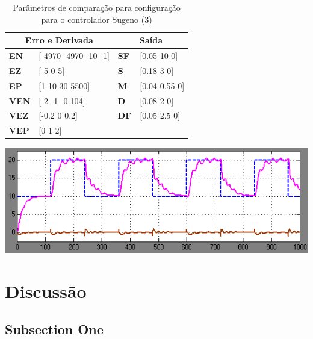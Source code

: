 \documentclass[
	twoside,				%
	twocolumn,				%
	english,				%
	brazil,					%
]{article}
\begin{document}
\begin{table}
\caption{Parâmetros de comparação para configuração para o controlador Sugeno (3)}
\centering
\begin{tabular}{llll}
\toprule
\multicolumn{2}{c}{\textbf{Erro e Derivada}} & \multicolumn{2}{c}{\textbf{Saída}}  \\
\midrule
\textbf{EN} & [-4970 -4970 -10 -1] & \textbf{SF} & [0.05 10 0] \\
\textbf{EZ} & [-5 0 5] & \textbf{S} & [0.18 3 0] \\
\textbf{EP} & [1 10 30 5500] & \textbf{M} & [0.04 0.55 0] \\
\textbf{VEN} & [-2 -1 -0.104] & \textbf{D} & [0.08 2 0] \\
\textbf{VEZ} & [-0.2 0 0.2] & \textbf{DF} & [0.05 2.5 0] \\
\textbf{VEP} & [0 1 2] & & \\
\bottomrule
\end{tabular}
\end{table}

\includegraphics[width=\columnwidth]{sugeno3}



\section{Discussão}

\subsection{Subsection One}
\end{document}
